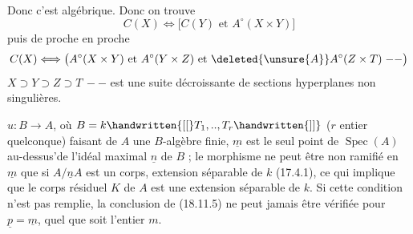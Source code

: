 Donc c'est algébrique. Donc on trouve
\[
 C(X)\Longleftrightarrow\bigl[C(Y)\text{ et }A^\circ(X\times Y)\bigr]
\]
puis de proche en proche
\[
 C(X)\Longleftrightarrow\bigl(A^\circ(X\times Y)\text{ et }A^\circ(Y\times Z)\text{ et }\deleted{\unsure{A}}A^\circ(Z\times T)\;{-}{-}\bigr)
\]
 $X\supset Y\supset Z\supset T\,{-}{-}$ est une suite décroissante de sections hyperplanes non singulières.



$u:B\to A$, où $B=k\handwritten{[[}T_1,..,T_r\handwritten{]]}$ ($r$ entier quelconque) faisant de $A$ une $B$-algèbre finie, $\underline{m}$ est le seul point de $\operatorname{Spec}(A)$ au-dessus'de l'idéal maximal  $\underline{n}$ de $B$ ;  le morphisme   ne peut être non ramifié en $\underline{m}$ que si $A/\underline{n}A$ est un corps, extension séparable de $k$ (17.4.1), ce qui implique que le corps résiduel $K$ de $A$ est une extension séparable de $k$. Si cette condition n'est pas remplie, la conclusion de (18.11.5) ne peut jamais être vérifiée pour $\underline{p}=\underline{m}$, quel que soit l'entier $m$.

